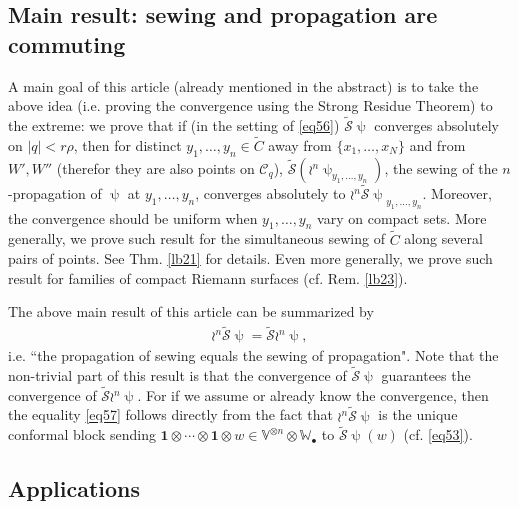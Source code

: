 \documentclass[12pt,a4paper,notitlepage]{article}
\theoremstyle{definition}
\theoremstyle{plain}
\newcommand{\mc}{\mathcal}
\newcommand{\wtd}{\widetilde}
\newcommand{\id}{\mathbf{1}}
\newcommand{\blt}{\bullet}
\newcommand{\Vbb}{\mathbb V}
\newcommand{\Wbb}{\mathbb W}
\numberwithin{equation}{section}
\begin{document}
\subsection*{Main result: sewing and propagation are commuting}

A main goal of this article (already mentioned in the abstract) is to take the above idea (i.e. proving the convergence using the Strong Residue Theorem) to the extreme: we prove that if (in the setting of \eqref{eq56}) $\wtd{\mc S}\uppsi$ converges absolutely on $|q|<r\rho$, then for distinct $y_1,\dots,y_n\in \wtd C$ away from $\{x_1,\dots,x_N\}$ and from $W',W''$ (therefor they are also  points on $\mc C_q$), $\wtd{\mc S}(\wr^n\uppsi_{y_1,\dots,y_n})$, the sewing of the $n$-propagation of $\uppsi$ at $y_1,\dots,y_n$, converges absolutely to $\wr^n{\wtd{\mc S}\uppsi}_{y_1,\dots,y_n}$. Moreover, the convergence should be uniform when $y_1,\dots,y_n$ vary on compact sets. More generally, we prove such result for the simultaneous sewing of $\wtd C$ along several pairs of points. See Thm. \ref{lb21} for details. Even more generally, we prove such result for families of compact Riemann surfaces (cf. Rem. \ref{lb23}).

The above main result of this article can be summarized by
\begin{align}
\wr^n\wtd{\mc S}\uppsi=\wtd{\mc S}\wr^n\uppsi,	\label{eq57}
\end{align}
i.e. ``the propagation of sewing equals the sewing of propagation". Note that the non-trivial part of this result is  that the convergence of $\wtd{\mc S}\uppsi$ guarantees the convergence of $\wtd{\mc S}\wr^n\uppsi$. For if we assume or already know the convergence, then the equality \eqref{eq57} follows directly from the fact that $\wr^n\wtd{\mc S}\uppsi$ is the unique conformal block sending $\id\otimes\cdots\otimes\id\otimes w\in\Vbb^{\otimes n}\otimes\Wbb_\blt$ to $\wtd{\mc S}\uppsi(w)$ (cf. \eqref{eq53}).


\subsection*{Applications}
\end{document}
